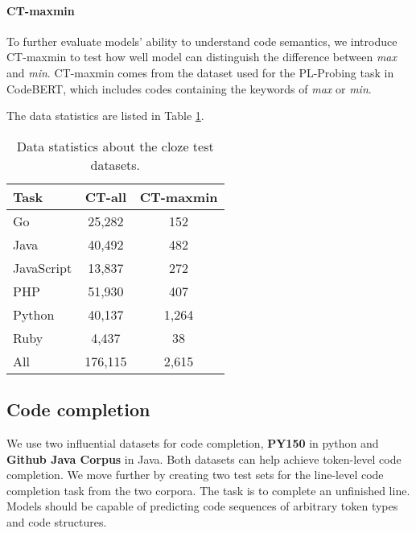 \documentclass[sigconf,nonacm,screen]{acmart}
\begin{document}
\paragraph{CT-maxmin} To further evaluate models' ability to understand code semantics, we introduce CT-maxmin to test how well model can distinguish the difference between \textit{max} and \textit{min}. CT-maxmin comes from the dataset used for the PL-Probing task in CodeBERT\cite{feng2020codebert}, which includes codes containing the keywords of \textit{max} or \textit{min}.

The data statistics are listed in Table \ref{table-clozetest-data-statistic}.

\begin{table}[h]
	\caption{Data statistics about the cloze test datasets.}
	\label{table-clozetest-data-statistic}
	\begin{center}
		\begin{tabular}{lcc}
			\toprule 
			Task & CT-all & CT-maxmin \\
\midrule 
			Go       &  25,282     &    152  \\
			Java     &  40,492     &    482  \\
			JavaScript &13,837     &    272  \\
			PHP     &   51,930     &    407  \\
			Python  &   40,137     &    1,264  \\
			Ruby    &   4,437      &    38  \\
			\midrule 
			All     &   176,115    &    2,615 \\
			\bottomrule
		\end{tabular}
	\end{center}
\end{table}




\subsection{Code completion}
We use two influential datasets for code completion, \textbf{PY150} in python and \textbf{Github Java Corpus} in Java. Both datasets can help achieve token-level code completion. 
We move further by creating two test sets for the line-level code completion task from the two corpora.
The task is to complete an unfinished line. Models should be capable of predicting code sequences of arbitrary token types and code structures. 
\end{document}
